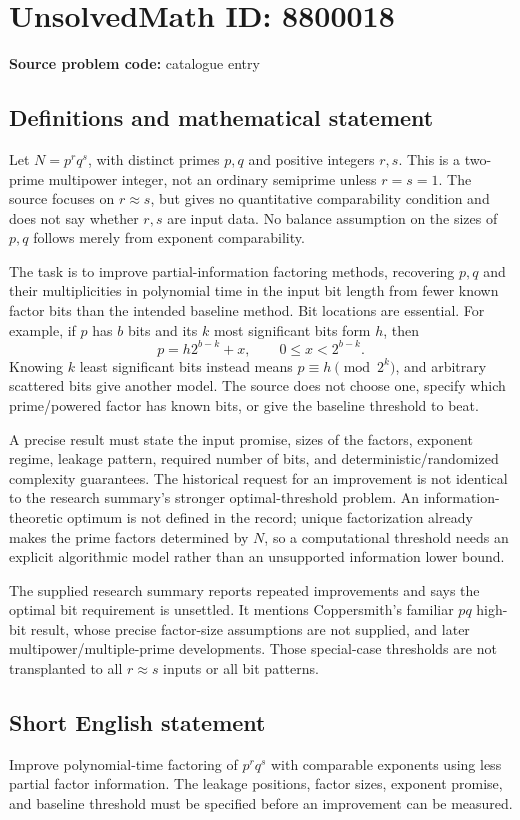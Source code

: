 \documentclass[11pt]{article}
\begin{document}
\section*{UnsolvedMath ID: 8800018}
\textbf{Source problem code:} catalogue entry
\subsection{Definitions and mathematical statement}
Let \(N=p^rq^s\), with distinct primes \(p,q\) and positive integers \(r,s\). This is a two-prime multipower integer, not an ordinary semiprime unless \(r=s=1\). The source focuses on \(r\approx s\), but gives no quantitative comparability condition and does not say whether \(r,s\) are input data. No balance assumption on the sizes of \(p,q\) follows merely from exponent comparability.

The task is to improve partial-information factoring methods, recovering \(p,q\) and their multiplicities in polynomial time in the input bit length from fewer known factor bits than the intended baseline method. Bit locations are essential. For example, if \(p\) has \(b\) bits and its \(k\) most significant bits form \(h\), then
\[
p=h2^{b-k}+x,\qquad0\le x<2^{b-k}.
\]
Knowing \(k\) least significant bits instead means \(p\equiv h\pmod{2^k}\), and arbitrary scattered bits give another model. The source does not choose one, specify which prime/powered factor has known bits, or give the baseline threshold to beat.

A precise result must state the input promise, sizes of the factors, exponent regime, leakage pattern, required number of bits, and deterministic/randomized complexity guarantees. The historical request for an improvement is not identical to the research summary's stronger optimal-threshold problem. An information-theoretic optimum is not defined in the record; unique factorization already makes the prime factors determined by \(N\), so a computational threshold needs an explicit algorithmic model rather than an unsupported information lower bound.

The supplied research summary reports repeated improvements and says the optimal bit requirement is unsettled. It mentions Coppersmith's familiar \(pq\) high-bit result, whose precise factor-size assumptions are not supplied, and later multipower/multiple-prime developments. Those special-case thresholds are not transplanted to all \(r\approx s\) inputs or all bit patterns.
\subsection{Short English statement}
Improve polynomial-time factoring of \(p^rq^s\) with comparable exponents using less partial factor information. The leakage positions, factor sizes, exponent promise, and baseline threshold must be specified before an improvement can be measured.
\end{document}
